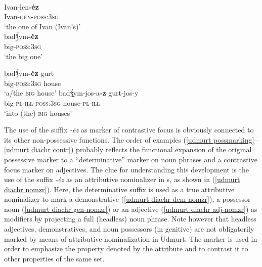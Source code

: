 \begin{exe}
\begin{xlist}
\begin{xlist}
\newpage
{}\\
\label{udmurt diachr gen-nomzr}
\gll	Ivan-len\textbf{-ėz}\\
	Ivan-\textsc{gen}-\textsc{poss:3sg}\\
\glt	 ‘the one of Ivan (Ivan's)’
\\
\label{udmurt diachr adj-nomzr}
\gll	badǯ́ym\textbf{-ėz}\\
	big-\textsc{poss:3sg}\\
\glt	 ‘the big one’
\end{xlist}
\label{udmurt diachr contr}
\begin{xlist}
\ex	
\gll	badǯ́ym\textbf{-ėz} gurt\\
	big-\textsc{poss:3sg} house\\
\glt	‘a/the \textsc{big} house’
\ex	
\gll	badǯ́ym-jos-a\textbf{-z} gurt-jos-y\\
	big-\textsc{pl}-\textsc{ill}-\textsc{poss:3sg} house-\textsc{pl}-\textsc{ill}\\
\glt	‘into (the) \textsc{big} houses’
\end{xlist}
\end{xlist}
\end{exe}

The use of the suffix \textit{-ėz} as marker of contrastive focus is obviously connected to its other non-possessive functions. The order of examples (\ref{udmurt possmarking}–\ref{udmurt diachr contr}) probably reflects the functional expansion of the original possessive marker to a “determinative” marker on noun phrases and a contrastive focus marker on adjectives. The clue for understanding this development is the use of the suffix \textit{-ėz} as an attributive nominalizer in s, as shown in (\ref{udmurt diachr nomzr}). Here, the determinative suffix is used as a true attributive nominalizer to mark a demonstrative (\ref{udmurt diachr dem-nomzr}), a possessor noun (\ref{udmurt diachr gen-nomzr}) or an adjective (\ref{udmurt diachr adj-nomzr}) as modifiers by projecting a full (headless) noun phrase. Note however that headless adjectives, demonstratives, and noun possessors (in genitive) are not obligatorily marked by means of attributive nominalization in Udmurt. The marker is used in order to emphasize the property denoted by the attribute and to contrast it to other properties of the same set.


